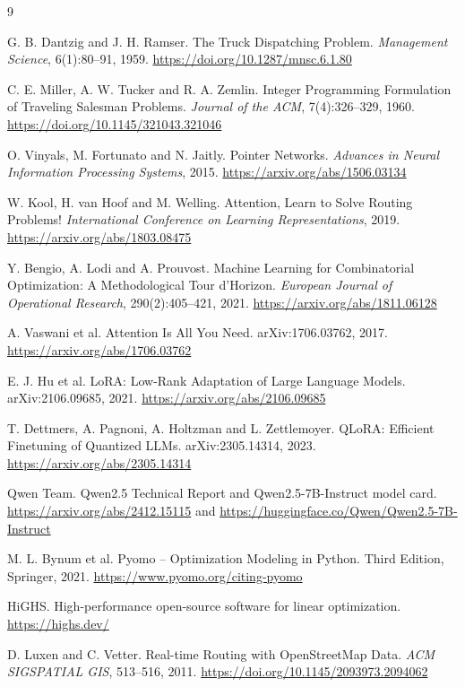 \documentclass[11pt,a4paper]{article}
\begin{document}
\begin{thebibliography}{9}

G. B. Dantzig and J. H. Ramser.
\newblock The Truck Dispatching Problem.
\newblock \textit{Management Science}, 6(1):80--91, 1959.
\newblock \url{https://doi.org/10.1287/mnsc.6.1.80}

C. E. Miller, A. W. Tucker and R. A. Zemlin.
\newblock Integer Programming Formulation of Traveling Salesman Problems.
\newblock \textit{Journal of the ACM}, 7(4):326--329, 1960.
\newblock \url{https://doi.org/10.1145/321043.321046}

O. Vinyals, M. Fortunato and N. Jaitly.
\newblock Pointer Networks.
\newblock \textit{Advances in Neural Information Processing Systems}, 2015.
\newblock \url{https://arxiv.org/abs/1506.03134}

W. Kool, H. van Hoof and M. Welling.
\newblock Attention, Learn to Solve Routing Problems!
\newblock \textit{International Conference on Learning Representations}, 2019.
\newblock \url{https://arxiv.org/abs/1803.08475}

Y. Bengio, A. Lodi and A. Prouvost.
\newblock Machine Learning for Combinatorial Optimization: A Methodological Tour d'Horizon.
\newblock \textit{European Journal of Operational Research}, 290(2):405--421, 2021.
\newblock \url{https://arxiv.org/abs/1811.06128}

A. Vaswani et al.
\newblock Attention Is All You Need.
\newblock arXiv:1706.03762, 2017.
\newblock \url{https://arxiv.org/abs/1706.03762}

E. J. Hu et al.
\newblock LoRA: Low-Rank Adaptation of Large Language Models.
\newblock arXiv:2106.09685, 2021.
\newblock \url{https://arxiv.org/abs/2106.09685}

T. Dettmers, A. Pagnoni, A. Holtzman and L. Zettlemoyer.
\newblock QLoRA: Efficient Finetuning of Quantized LLMs.
\newblock arXiv:2305.14314, 2023.
\newblock \url{https://arxiv.org/abs/2305.14314}

Qwen Team.
\newblock Qwen2.5 Technical Report and Qwen2.5-7B-Instruct model card.
\newblock \url{https://arxiv.org/abs/2412.15115} and \url{https://huggingface.co/Qwen/Qwen2.5-7B-Instruct}

M. L. Bynum et al.
\newblock Pyomo -- Optimization Modeling in Python.
\newblock Third Edition, Springer, 2021.
\newblock \url{https://www.pyomo.org/citing-pyomo}

HiGHS.
\newblock High-performance open-source software for linear optimization.
\newblock \url{https://highs.dev/}

D. Luxen and C. Vetter.
\newblock Real-time Routing with OpenStreetMap Data.
\newblock \textit{ACM SIGSPATIAL GIS}, 513--516, 2011.
\newblock \url{https://doi.org/10.1145/2093973.2094062}

\end{thebibliography}
\end{document}
